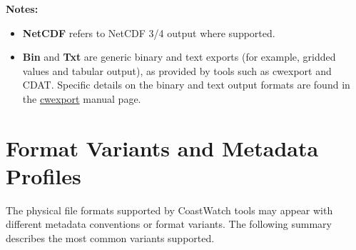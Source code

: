 \medskip
\noindent\textbf{Notes:}
\begin{itemize}
  \item \textbf{NetCDF} refers to NetCDF 3/4 output where supported.
  \item \textbf{Bin} and \textbf{Txt} are generic binary and text exports (for example,
        gridded values and tabular output), as provided by tools such as cwexport
        and CDAT.  Specific details on the binary and text output formats are found in
        the \hyperlink{cwexport}{cwexport} manual page.
\end{itemize}

\newpage

\section{Format Variants and Metadata Profiles}
\label{format_specs}

The physical file formats supported by CoastWatch tools may appear with different
metadata conventions or format variants. The following summary describes the
most common variants supported.

